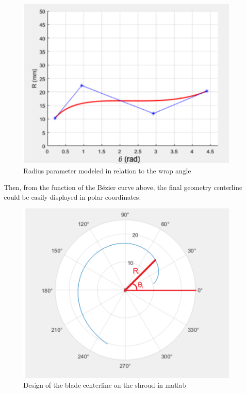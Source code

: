 \documentclass[11pt,a4paper]{scrartcl}
\begin{document}
\begin{figure}[h]
    \centering
    \includegraphics[scale=1]{image7.png}
    \caption{Radius parameter modeled in relation to the wrap angle 
}
    \label{fig:image4}
    
\end{figure}

Then, from the function of the Bézier curve above, the final geometry centerline could be easily displayed in polar coordinates.
\newpage


\begin{figure}[h]
    \centering
    \includegraphics[scale=1]{image8.png}
    \caption{ Design of the blade centerline on the shroud in matlab }
    \label{fig:image4}
    
\end{figure}
\end{document}
